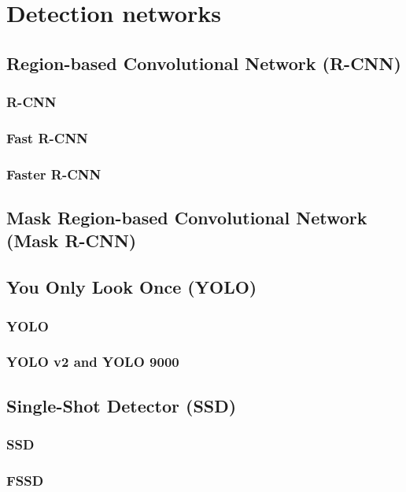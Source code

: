 
\section{Detection networks}
\label{chapt:models}


\subsection*{Region-based Convolutional Network (R-CNN)}
\subsubsection{R-CNN}
\subsubsection{Fast R-CNN}
\subsubsection{Faster R-CNN}

\subsection*{Mask Region-based Convolutional Network (Mask R-CNN)}

\subsection*{You Only Look Once (YOLO)}
\subsubsection{YOLO}
\label{sec:yolo}
\subsubsection{YOLO v2 and YOLO 9000}

\subsection*{Single-Shot Detector (SSD)}
\label{sec:ssd}
\subsubsection{SSD}

\subsubsection{FSSD}
